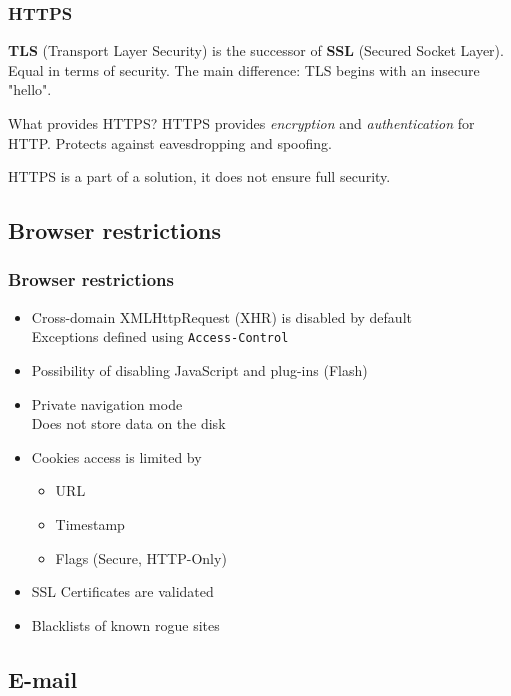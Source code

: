 \begin{frame}
\frametitle{HTTPS}
\textbf{TLS} (Transport Layer Security) is the successor of \textbf{SSL}
(Secured Socket Layer).
Equal in terms of security.
The main difference: TLS begins with an insecure "hello".
\begin{block}{What provides HTTPS?}
HTTPS provides \emph{encryption} and \emph{authentication} for HTTP.
\newline Protects against eavesdropping and spoofing.
\end{block}
\vspace{1em}
HTTPS is a part of a solution, it does not ensure full security.
\end{frame}

\subsection{Browser restrictions}

\begin{frame}
\frametitle{Browser restrictions}
\begin{itemize}
\item Cross-domain XMLHttpRequest (XHR) is disabled by default
	\\ Exceptions defined using \texttt{Access-Control}
\item Possibility of disabling JavaScript and plug-ins (Flash)
\item Private navigation mode
	\\ Does not store data on the disk
\item Cookies access is limited by
	\begin{itemize}
	\item URL
	\item Timestamp
	\item Flags (Secure, HTTP-Only)
	\end{itemize}
\item SSL Certificates are validated
\item Blacklists of known rogue sites
\end{itemize}
\end{frame}

\subsection{E-mail}

